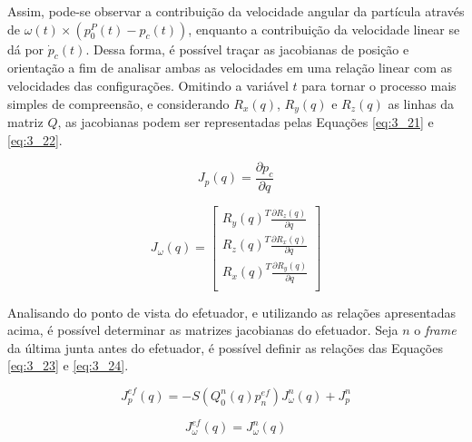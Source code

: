 Assim, pode-se observar a contribuição da velocidade angular da partícula através de $\omega(t) \times (p^P_0(t) - p_c(t))$, enquanto a contribuição da velocidade linear se dá por $\dot{p}_c(t)$. Dessa forma, é possível traçar as jacobianas de posição e orientação a fim de analisar ambas as velocidades em uma relação linear com as velocidades das configurações. Omitindo a variável $t$ para tornar o processo mais simples de compreensão, e considerando $R_x(q)$, $R_y(q)$ e $R_z(q)$ as linhas da matriz $Q$, as jacobianas podem ser representadas pelas Equações \ref{eq:3_21} e \ref{eq:3_22}.

\begin{equation}
J_p(q) = \frac{\partial p_c}{\partial q}
\label{eq:3_21}
\end{equation}

\begin{equation}
J_{\omega}(q) =
\begin{bmatrix}
R_y(q)^T \frac{\partial R_z(q)}{\partial q}\\
R_z(q)^T \frac{\partial R_x(q)}{\partial q}\\
R_x(q)^T \frac{\partial R_y(q)}{\partial q}\\
\end{bmatrix}
\label{eq:3_22}
\end{equation}

Analisando do ponto de vista do efetuador, e utilizando as relações apresentadas acima, é possível determinar as matrizes jacobianas do efetuador. Seja $n$ o \textit{frame} da última junta antes do efetuador, é possível definir as relações das Equações \ref{eq:3_23} e \ref{eq:3_24}.

\begin{equation}
J^{ef}_p(q) = -S(Q^n_0(q)p^{ef}_n)J^n_{\omega}(q) + J^n_p
\label{eq:3_23}
\end{equation}

\begin{equation}
J^{ef}_{\omega}(q) = J^n_{\omega}(q)
\label{eq:3_24}
\end{equation}




